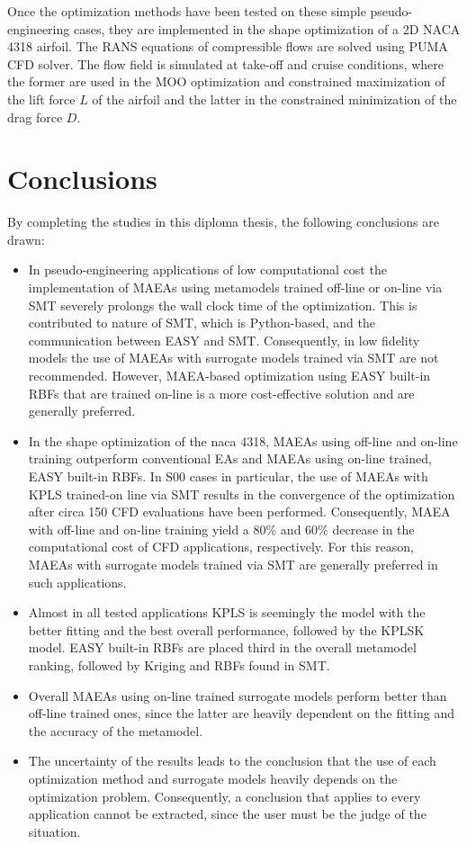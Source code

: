 Once the optimization methods have been tested on these simple 
pseudo-engineering cases, they are implemented in the shape 
optimization of a 2D NACA 4318 airfoil. The RANS equations of 
compressible flows are solved using PUMA CFD solver. The flow field 
is simulated at take-off and cruise conditions, where the former 
are used in the MOO optimization and constrained maximization of 
the lift force $L$ of the airfoil and the latter in the constrained 
minimization of the drag force $D$.

\vspace{5mm}

\section{Conclusions}
By completing the studies in this diploma thesis, the following 
conclusions are drawn:
\begin{itemize}
\item  In pseudo-engineering applications of low computational 
cost the implementation of MAEAs using metamodels trained off-line 
or on-line via SMT severely prolongs the wall clock time of the 
optimization. This is contributed to nature of SMT, which is 
Python-based, and the communication between EASY and SMT. 
Consequently, in low fidelity models the use of MAEAs with 
surrogate models trained via SMT are not recommended. However, 
MAEA-based optimization using EASY built-in RBFs that are trained 
on-line is a more cost-effective solution and are generally 
preferred. 

\item In the shape optimization of the naca 4318, MAEAs using 
off-line and on-line training outperform conventional EAs and 
MAEAs using on-line trained, EASY built-in RBFs. In S00 cases in 
particular, the use of MAEAs with KPLS trained-on line via SMT 
results in the convergence of the optimization after circa 150 CFD 
evaluations have been performed. Consequently, MAEA with off-line 
and on-line training yield a $80 \%$ and $60 \%$ decrease in the 
computational cost of CFD applications, respectively. For this 
reason, MAEAs with surrogate models trained via SMT are generally 
preferred in such applications. 

\item Almost in all tested applications KPLS is seemingly the model
with the better fitting and the best overall performance, followed 
by the KPLSK model. EASY built-in RBFs are placed third in the 
overall metamodel ranking, followed by Kriging and RBFs found  
in SMT.

\item Overall MAEAs using on-line trained surrogate models perform 
better than off-line trained ones, since the latter are heavily 
dependent on the fitting and the accuracy of the metamodel.

\item The uncertainty of the results leads to the conclusion that 
the use of each optimization method and surrogate models heavily 
depends on the optimization problem. Consequently, a conclusion 
that applies to every application cannot be extracted, since the 
user must be the judge of the situation.
\end{itemize}

